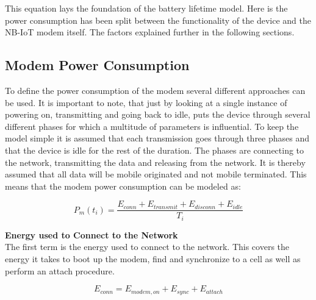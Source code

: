 This equation lays the foundation of the battery lifetime model. Here is the power consumption has been split between the functionality of the device and the NB-IoT modem itself. The factors explained further in the following sections.

\subsection{Modem Power Consumption}

To define the power consumption of the modem several different approaches can be used. It is important to note, that just by looking at a single instance of powering on, transmitting and going back to idle, puts the device through several different phases for which a multitude of parameters is influential. To keep the model simple it is assumed that each transmission goes through three phases and that the device is idle for the rest of the duration. The phases are connecting to the network, transmitting the data and releasing from the network. It is thereby assumed that all data will be mobile originated and not mobile terminated. This means that the modem power consumption can be modeled as:

\begin{equation}
P_m(t_i) = \frac{E_{conn} + E_{transmit} + E_{disconn} + E_{idle}}{T_i}
\end{equation}
\begin{where}
\end{where}


\textbf{Energy used to Connect to the Network}\\
The first term is the energy used to connect to the network. This covers the energy it takes to boot up the modem, find and synchronize to a cell as well as perform an attach procedure. 

\begin{equation}
E_{conn} = E_{modem,on} + E_{sync} + E_{attach}
\end{equation}
\begin{where}
\end{where}

